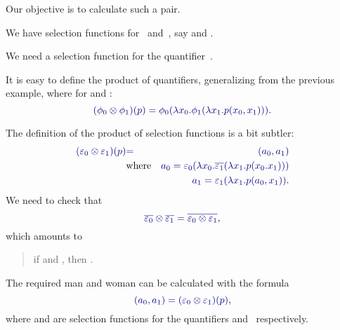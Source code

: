 \documentclass%
[%
Screen4to3,
]{foils}
\begin{document}
\vfill

Our objective is to calculate such a pair. %



We have selection functions
for~\darkblue{$\forall$} and~\darkblue{$\exists$}, say
 and .

\vfill

We need a selection function
 for the
quantifier~\darkblue{$\phi = \forall \otimes \exists$}.


It is easy to define the product \darkblue{$\otimes$} of quantifiers,
generalizing from the previous example, where  for  and :
\[
\darkblue{(\phi_0 \otimes \phi_1)(p)=\phi_0(\lambda x_0.\phi_1(\lambda x_1.p(x_0,x_1)))}.
\]


The definition of the product of selection functions is a bit subtler:
\begin{eqnarray*}
  \darkblue{(\varepsilon_0 \otimes \varepsilon_1)(p)} & \darkblue{=} & \darkblue{(a_0,a_1)} \\
        & \text{where} & \darkblue{a_0 = \varepsilon_0(\lambda x_0.\overline{\varepsilon_1}(\lambda x_1.p(x_0.x_1)))} \\
        & & \darkblue{a_1 = \varepsilon_1(\lambda x_1.p(a_0,x_1))}.
\end{eqnarray*}
We need to check that 
\[
\darkblue{\overline{\varepsilon_0} \otimes \overline{\varepsilon_1}
= \overline{\varepsilon_0 \otimes \varepsilon_1}},
\]
which amounts to
\begin{quote}
  if  and , then .
\end{quote}



The required man and woman can be calculated with the formula
\[
\darkblue{(a_0,a_1) = (\varepsilon_0 \otimes \varepsilon_1)(p)},
\]
where  and  are selection functions for
the quantifiers \darkblue{$\forall$} and~\darkblue{$\exists$} respectively.
\end{document}
